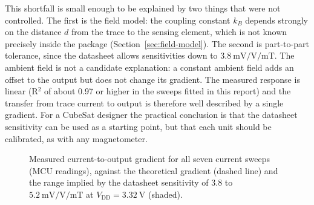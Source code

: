 \documentclass[12pt,a4paper]{article}
\begin{document}
This shortfall is small enough to be explained by two things that were not controlled. The first is the field model: the coupling constant $k_B$ depends strongly on the distance $d$ from the trace to the sensing element, which is not known precisely inside the package (Section~\ref{sec:field-model}). The second is part-to-part tolerance, since the datasheet allows sensitivities down to $\SI{3.8}{\milli\volt\per\volt\per\milli\tesla}$. The ambient field is not a candidate explanation: a constant ambient field adds an offset to the output but does not change its gradient. The measured response is linear (R$^2$ of about 0.97 or higher in the sweeps fitted in this report) and the transfer from trace current to output is therefore well described by a single gradient. For a CubeSat designer the practical conclusion is that the datasheet sensitivity can be used as a starting point, but that each unit should be calibrated, as with any magnetometer.

\begin{figure}[H]
\centering
{}
\caption{Measured current-to-output gradient for all seven current sweeps (MCU readings), against the theoretical gradient (dashed line) and the range implied by the datasheet sensitivity of 3.8 to $\SI{5.2}{\milli\volt\per\volt\per\milli\tesla}$ at $V_{\text{DD}} = \SI{3.32}{\volt}$ (shaded).}
\label{fig:gradient-summary}
\end{figure}
\end{document}
